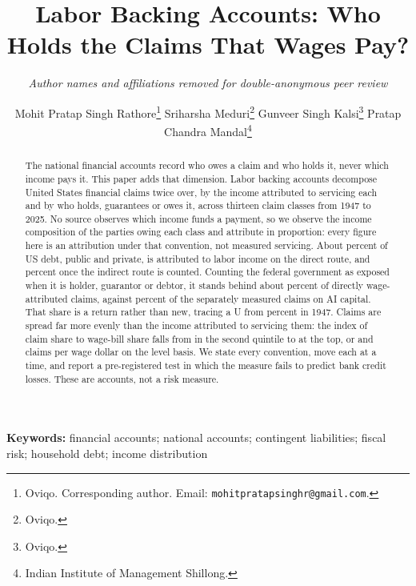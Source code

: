 \documentclass[11pt]{article}
\title{\bfseries Labor Backing Accounts: Who Holds the Claims That Wages Pay?}
\author{\normalsize\itshape Author names and affiliations removed for double-anonymous peer review}
\author{%
    Mohit Pratap Singh Rathore\thanks{Oviqo. Corresponding author. Email:
      \texttt{mohitpratapsinghr@gmail.com}.}\quad
    Sriharsha Meduri\thanks{Oviqo.}\quad
    Gunveer Singh Kalsi\thanks{Oviqo.}%
    \ifthreeauth\else\quad
    Pratap Chandra Mandal\thanks{Indian Institute of Management Shillong.}\fi}
\date{}
\theoremstyle{definition}
\begin{document}
\maketitle

\begin{abstract}
\noindent
The national financial accounts record who owes a claim and who holds it, never which income pays
it. This paper adds that dimension. Labor backing accounts decompose United States financial
claims twice over, by the income attributed to servicing each and by who holds, guarantees or owes
it, across thirteen claim classes from 1947 to 2025. No source observes which income funds a
payment, so we observe the income composition of the parties owing each class and attribute in
proportion: every figure here is an attribution under that convention, not measured servicing.
About  percent of US debt, public and private, is attributed to labor
income on the direct route, and  percent once the indirect route is
counted. Counting the federal government as exposed when it is holder, guarantor or debtor, it
stands behind about  percent of directly wage-attributed claims, against
 percent of the separately measured claims on AI capital. That share
is a return rather than new, tracing a U from  percent in 1947. Claims are
spread far more evenly than the income attributed to servicing them: the index of claim share to
wage-bill share falls from  in the second quintile to
 at the top, or  and  claims per wage
dollar on the level basis. We state every convention, move each at a time, and report a
pre-registered test in which the measure fails to predict bank credit losses. These are accounts,
not a risk measure.
\end{abstract}

\vspace{0.5em}
\noindent\textbf{Keywords:} financial accounts; national accounts; contingent liabilities; fiscal
risk; household debt; income distribution

\vspace{1em}








\end{document}
